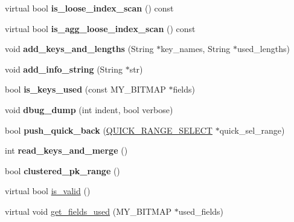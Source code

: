\begin{DoxyCompactItemize}
virtual bool {\bfseries is\+\_\+loose\+\_\+index\+\_\+scan} () const
\item 
\mbox{\label{classQUICK__INDEX__MERGE__SELECT_ae16ceaa7fcba78090dced1689105deee}} 
virtual bool {\bfseries is\+\_\+agg\+\_\+loose\+\_\+index\+\_\+scan} () const
\item 
\mbox{\label{classQUICK__INDEX__MERGE__SELECT_ab51ad1231aff10eb3e674c03c48b17b0}} 
void {\bfseries add\+\_\+keys\+\_\+and\+\_\+lengths} (String $\ast$key\+\_\+names, String $\ast$used\+\_\+lengths)
\item 
\mbox{\label{classQUICK__INDEX__MERGE__SELECT_a7fa84ae9c8a7751c7ffc62e85cd51d26}} 
void {\bfseries add\+\_\+info\+\_\+string} (String $\ast$str)
\item 
\mbox{\label{classQUICK__INDEX__MERGE__SELECT_a7e78fa52b54e7b5c04359c0148dc403e}} 
bool {\bfseries is\+\_\+keys\+\_\+used} (const M\+Y\+\_\+\+B\+I\+T\+M\+AP $\ast$fields)
\item 
\mbox{\label{classQUICK__INDEX__MERGE__SELECT_a7013d5032a35d2bc928a35aeca39ad7b}} 
void {\bfseries dbug\+\_\+dump} (int indent, bool verbose)
\item 
\mbox{\label{classQUICK__INDEX__MERGE__SELECT_a3186cccac6b830cdfd0dae5fcc8ec082}} 
bool {\bfseries push\+\_\+quick\+\_\+back} (\mbox{\hyperlink{classQUICK__RANGE__SELECT}{Q\+U\+I\+C\+K\+\_\+\+R\+A\+N\+G\+E\+\_\+\+S\+E\+L\+E\+CT}} $\ast$quick\+\_\+sel\+\_\+range)
\item 
\mbox{\label{classQUICK__INDEX__MERGE__SELECT_af275fca523849ef8f2d571079383e60c}} 
int {\bfseries read\+\_\+keys\+\_\+and\+\_\+merge} ()
\item 
\mbox{\label{classQUICK__INDEX__MERGE__SELECT_afe44c634e985bb071d9b8bf7d0764773}} 
bool {\bfseries clustered\+\_\+pk\+\_\+range} ()
\item 
virtual bool \mbox{\hyperlink{classQUICK__INDEX__MERGE__SELECT_a1feb668246b5f37b92cf069ac544337b}{is\+\_\+valid}} ()
\item 
virtual void \mbox{\hyperlink{classQUICK__INDEX__MERGE__SELECT_a86dbd62d24d324f5203d6c475eed86e0}{get\+\_\+fields\+\_\+used}} (M\+Y\+\_\+\+B\+I\+T\+M\+AP $\ast$used\+\_\+fields)
\end{DoxyCompactItemize}
